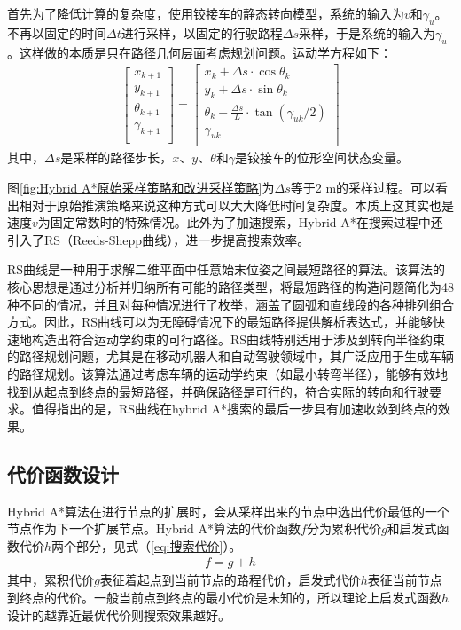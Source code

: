 \documentclass[master,academic]{ysuthesis} %
\begin{document}
		首先为了降低计算的复杂度，使用铰接车的静态转向模型，系统的输入为$v$和$\gamma_u$。不再以固定的时间$\Delta t$进行采样，以固定的行驶路程$\Delta s$采样，于是系统的输入为$\gamma_u$。这样做的本质是只在路径几何层面考虑规划问题。运动学方程如下：
		\begin{equation}
			\begin{aligned}
				\left[ \begin{array}{c}
					x_{k+1}\\
					y_{k+1}\\
					\theta _{k+1}\\
					\gamma _{k+1}\\
				\end{array} \right] =\left[ \begin{array}{c}
					x_k+\Delta s\cdot \cos\theta _k\\
					y_k+\Delta s\cdot \sin\theta _k\\
					\theta _k+\frac{\Delta s}{L}\cdot \tan (\gamma _{uk}/2 )\\
					\gamma _{uk}\\
				\end{array} \right] 
			\end{aligned}
			\label{eq:改进运动学推演策略}
		\end{equation}
		其中，$\Delta s$是采样的路径步长，$x$、$y$、$\theta$和$\gamma$是铰接车的位形空间状态变量。

		图\ref{fig:Hybrid A*原始采样策略和改进采样策略}为$\Delta s$等于2 m的采样过程。可以看出相对于原始推演策略来说这种方式可以大大降低时间复杂度。本质上这其实也是速度$v$为固定常数时的特殊情况。此外为了加速搜索，Hybrid A*在搜索过程中还引入了RS（Reeds-Shepp曲线），进一步提高搜索效率。
		
		RS曲线是一种用于求解二维平面中任意始末位姿之间最短路径的算法。该算法的核心思想是通过分析并归纳所有可能的路径类型，将最短路径的构造问题简化为48种不同的情况，并且对每种情况进行了枚举，涵盖了圆弧和直线段的各种排列组合方式。因此，RS曲线可以为无障碍情况下的最短路径提供解析表达式，并能够快速地构造出符合运动学约束的可行路径。RS曲线特别适用于涉及到转向半径约束的路径规划问题，尤其是在移动机器人和自动驾驶领域中，其广泛应用于生成车辆的路径规划。该算法通过考虑车辆的运动学约束（如最小转弯半径），能够有效地找到从起点到终点的最短路径，并确保路径是可行的，符合实际的转向和行驶要求。值得指出的是，RS曲线在hybrid A*搜索的最后一步具有加速收敛到终点的效果。

		\subsection{代价函数设计}
		Hybrid A*算法在进行节点的扩展时，会从采样出来的节点中选出代价最低的一个节点作为下一个扩展节点。Hybrid A*算法的代价函数$f$分为累积代价$g$和启发式函数代价$h$两个部分，见式（\ref{eq:搜索代价}）。
		\begin{equation}
			\begin{aligned}
				f = g+h
			\end{aligned}
			\label{eq:搜索代价}
		\end{equation}
		其中，累积代价$g$表征着起点到当前节点的路程代价，启发式代价$h$表征当前节点到终点的代价。一般当前点到终点的最小代价是未知的，所以理论上启发式函数$h$设计的越靠近最优代价则搜索效果越好。
		
\end{document}
